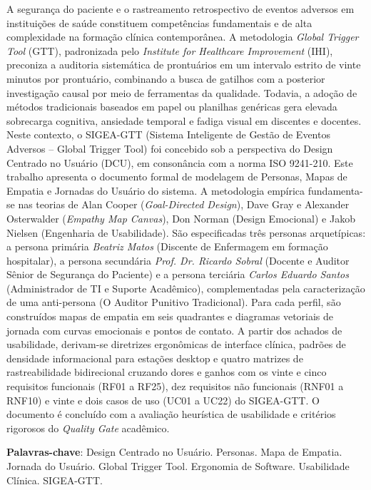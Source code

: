 \begin{resumo}
A segurança do paciente e o rastreamento retrospectivo de eventos adversos em instituições de saúde constituem competências fundamentais e de alta complexidade na formação clínica contemporânea. A metodologia \textit{Global Trigger Tool} (GTT), padronizada pelo \textit{Institute for Healthcare Improvement} (IHI), preconiza a auditoria sistemática de prontuários em um intervalo estrito de vinte minutos por prontuário, combinando a busca de gatilhos com a posterior investigação causal por meio de ferramentas da qualidade. Todavia, a adoção de métodos tradicionais baseados em papel ou planilhas genéricas gera elevada sobrecarga cognitiva, ansiedade temporal e fadiga visual em discentes e docentes. Neste contexto, o SIGEA-GTT (Sistema Inteligente de Gestão de Eventos Adversos -- Global Trigger Tool) foi concebido sob a perspectiva do Design Centrado no Usuário (DCU), em consonância com a norma ISO 9241-210. Este trabalho apresenta o documento formal de modelagem de Personas, Mapas de Empatia e Jornadas do Usuário do sistema. A metodologia empírica fundamenta-se nas teorias de Alan Cooper (\textit{Goal-Directed Design}), Dave Gray e Alexander Osterwalder (\textit{Empathy Map Canvas}), Don Norman (Design Emocional) e Jakob Nielsen (Engenharia de Usabilidade). São especificadas três personas arquetípicas: a persona primária \textit{Beatriz Matos} (Discente de Enfermagem em formação hospitalar), a persona secundária \textit{Prof. Dr. Ricardo Sobral} (Docente e Auditor Sênior de Segurança do Paciente) e a persona terciária \textit{Carlos Eduardo Santos} (Administrador de TI e Suporte Acadêmico), complementadas pela caracterização de uma anti-persona (O Auditor Punitivo Tradicional). Para cada perfil, são construídos mapas de empatia em seis quadrantes e diagramas vetoriais de jornada com curvas emocionais e pontos de contato. A partir dos achados de usabilidade, derivam-se diretrizes ergonômicas de interface clínica, padrões de densidade informacional para estações desktop e quatro matrizes de rastreabilidade bidirecional cruzando dores e ganhos com os vinte e cinco requisitos funcionais (RF01 a RF25), dez requisitos não funcionais (RNF01 a RNF10) e vinte e dois casos de uso (UC01 a UC22) do SIGEA-GTT. O documento é concluído com a avaliação heurística de usabilidade e critérios rigorosos do \textit{Quality Gate} acadêmico.

\textbf{Palavras-chave}: Design Centrado no Usuário. Personas. Mapa de Empatia. Jornada do Usuário. Global Trigger Tool. Ergonomia de Software. Usabilidade Clínica. SIGEA-GTT.
\end{resumo}
